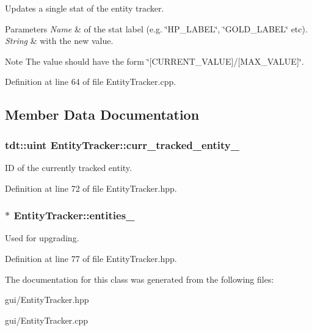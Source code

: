 Updates a single stat of the entity tracker. 


\begin{DoxyParams}{Parameters}
{\em Name} & of the stat label (e.\+g. \char`\"{}\+H\+P\+\_\+\+L\+A\+B\+E\+L\char`\"{}, \char`\"{}\+G\+O\+L\+D\+\_\+\+L\+A\+B\+E\+L\char`\"{} etc). \\
\hline
{\em String} & with the new value. \\
\hline
\end{DoxyParams}
\begin{DoxyNote}{Note}
The value should have the form \char`\"{}\mbox{[}\+C\+U\+R\+R\+E\+N\+T\+\_\+\+V\+A\+L\+U\+E\mbox{]}/\mbox{[}\+M\+A\+X\+\_\+\+V\+A\+L\+U\+E\mbox{]}\char`\"{}. 
\end{DoxyNote}


Definition at line 64 of file Entity\+Tracker.\+cpp.



\subsection{Member Data Documentation}
\subsubsection[{\texorpdfstring{curr\+\_\+tracked\+\_\+entity\+\_\+}{curr_tracked_entity_}}]{\setlength{\rightskip}{0pt plus 5cm}tdt\+::uint Entity\+Tracker\+::curr\+\_\+tracked\+\_\+entity\+\_\+\hspace{0.3cm}{\ttfamily [private]}}\hypertarget{class_entity_tracker_a1ef585f0b346bffb880cbbaaa34f1f47}{}\label{class_entity_tracker_a1ef585f0b346bffb880cbbaaa34f1f47}


ID of the currently tracked entity. 



Definition at line 72 of file Entity\+Tracker.\+hpp.

\subsubsection[{\texorpdfstring{entities\+\_\+}{entities_}}]{$\ast$ Entity\+Tracker\+::entities\+\_\+\hspace{0.3cm}{\ttfamily [private]}}\hypertarget{class_entity_tracker_ab7988f819653ef5a97df6f28170609d3}{}\label{class_entity_tracker_ab7988f819653ef5a97df6f28170609d3}


Used for upgrading. 



Definition at line 77 of file Entity\+Tracker.\+hpp.



The documentation for this class was generated from the following files\+:\begin{DoxyCompactItemize}
\item 
gui/Entity\+Tracker.\+hpp\item 
gui/Entity\+Tracker.\+cpp\end{DoxyCompactItemize}
